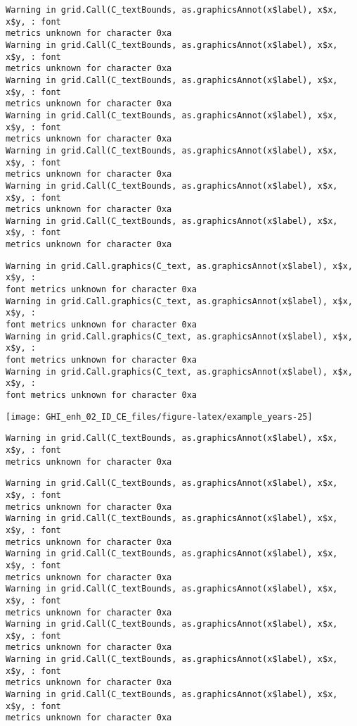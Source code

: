 \documentclass[
  10pt,
  a4paper,oneside]{article}
\begin{document}
\begin{verbatim}
Warning in grid.Call(C_textBounds, as.graphicsAnnot(x$label), x$x, x$y, : font
metrics unknown for character 0xa
Warning in grid.Call(C_textBounds, as.graphicsAnnot(x$label), x$x, x$y, : font
metrics unknown for character 0xa
Warning in grid.Call(C_textBounds, as.graphicsAnnot(x$label), x$x, x$y, : font
metrics unknown for character 0xa
Warning in grid.Call(C_textBounds, as.graphicsAnnot(x$label), x$x, x$y, : font
metrics unknown for character 0xa
Warning in grid.Call(C_textBounds, as.graphicsAnnot(x$label), x$x, x$y, : font
metrics unknown for character 0xa
Warning in grid.Call(C_textBounds, as.graphicsAnnot(x$label), x$x, x$y, : font
metrics unknown for character 0xa
Warning in grid.Call(C_textBounds, as.graphicsAnnot(x$label), x$x, x$y, : font
metrics unknown for character 0xa
\end{verbatim}

\begin{verbatim}
Warning in grid.Call.graphics(C_text, as.graphicsAnnot(x$label), x$x, x$y, :
font metrics unknown for character 0xa
Warning in grid.Call.graphics(C_text, as.graphicsAnnot(x$label), x$x, x$y, :
font metrics unknown for character 0xa
Warning in grid.Call.graphics(C_text, as.graphicsAnnot(x$label), x$x, x$y, :
font metrics unknown for character 0xa
Warning in grid.Call.graphics(C_text, as.graphicsAnnot(x$label), x$x, x$y, :
font metrics unknown for character 0xa
\end{verbatim}

\begin{center}\texttt{[image: GHI\_enh\_02\_ID\_CE\_files/figure-latex/example\_years-25]} \end{center}

\begin{verbatim}
Warning in grid.Call(C_textBounds, as.graphicsAnnot(x$label), x$x, x$y, : font
metrics unknown for character 0xa
\end{verbatim}

\begin{verbatim}
Warning in grid.Call(C_textBounds, as.graphicsAnnot(x$label), x$x, x$y, : font
metrics unknown for character 0xa
Warning in grid.Call(C_textBounds, as.graphicsAnnot(x$label), x$x, x$y, : font
metrics unknown for character 0xa
Warning in grid.Call(C_textBounds, as.graphicsAnnot(x$label), x$x, x$y, : font
metrics unknown for character 0xa
Warning in grid.Call(C_textBounds, as.graphicsAnnot(x$label), x$x, x$y, : font
metrics unknown for character 0xa
Warning in grid.Call(C_textBounds, as.graphicsAnnot(x$label), x$x, x$y, : font
metrics unknown for character 0xa
Warning in grid.Call(C_textBounds, as.graphicsAnnot(x$label), x$x, x$y, : font
metrics unknown for character 0xa
Warning in grid.Call(C_textBounds, as.graphicsAnnot(x$label), x$x, x$y, : font
metrics unknown for character 0xa
\end{verbatim}
\end{document}
